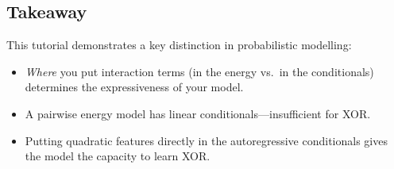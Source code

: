 \documentclass[11pt]{article}
\begin{document}
\subsection{Takeaway}

This tutorial demonstrates a key distinction in probabilistic modelling:
\begin{itemize}
  \item \emph{Where} you put interaction terms (in the energy vs.\ in
        the conditionals) determines the expressiveness of your model.
  \item A pairwise energy model has linear conditionals---insufficient
        for XOR.
  \item Putting quadratic features directly in the autoregressive
        conditionals gives the model the capacity to learn XOR.
\end{itemize}
\end{document}
